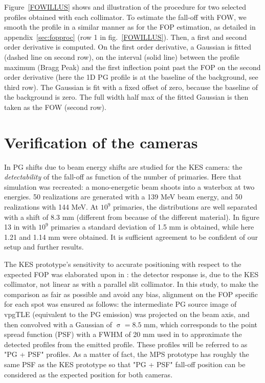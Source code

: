 \documentclass[a4paper,english]{article}
\begin{document}
Figure~\ref{FOWILLUS} shows and illustration of the procedure for two selected profiles obtained with each collimator. To estimate the fall-off with FOW, we smooth the profile in a similar manner as for the FOP estimation, as detailed in appendix~\ref{sec:fopproc} (row 1 in fig.~\ref{FOWILLUS}). Then, a first and second order derivative is computed. On the first order derivative, a Gaussian is fitted (dashed line on second row), on the interval (solid line) between the profile maximum (Bragg Peak) and the first inflection point past the FOP on the second order derivative (here the 1D PG profile is at the baseline of the background, see third row). The Gaussian is fit with a fixed offset of zero, because the baseline of the background is zero. The full width half max of the fitted Gaussian is then taken as the FOW (second row).


\section{Verification of the cameras}

In \cite{Priegnitz2015} PG shifts due to beam energy shifts are studied for the KES camera: the \emph{detectability} of the fall-off as function of the number of primaries. Here that simulation was recreated: a mono-energetic beam shoots into a waterbox at two energies. 50 realizations are generated with a 139 MeV beam energy, and 50 realizations with 144 MeV. At $10^9$ primaries, the distributions are well separated with a shift of 8.3 mm (different from \cite{Priegnitz2015} because of the different material). In figure 13 in \cite{Perali2014} with $10^9$ primaries a standard deviation of 1.5 mm is obtained, while here 1.21 and 1.14 mm were obtained. It is sufficient agreement to be confident of our setup and further results.

The KES prototype's sensitivity to accurate positioning with respect to the expected FOP was elaborated upon in \citet[Section IV.A.3]{Sterpin2015}: the detector response is, due to the KES collimator, not linear as with a parallel slit collimator. In this study, to make the comparison as fair as possible and avoid any bias, alignment on the FOP specific for each spot was ensured as follows: the intermediate PG source image of vpgTLE (equivalent to the PG emission) was projected on the beam axis, and then convolved with a Gaussian of $\upsigma = 8.5$ mm, which corresponds to the point spread function (PSF) with a FWHM of 20 mm used in \cite{Priegnitz2015} to approximate the detected profiles from the emitted profile. These profiles will be referred to as "PG + PSF" profiles. As a matter of fact, the MPS prototype has roughly the same PSF as the KES prototype so that "PG + PSF" fall-off position can be considered as the expected position for both cameras.
\end{document}
